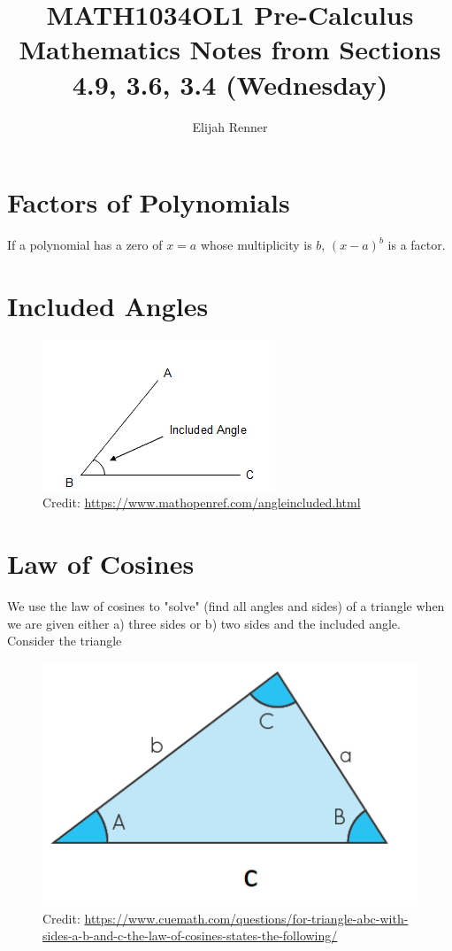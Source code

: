 \documentclass[12pt]{article}
\title{MATH1034OL1 Pre-Calculus Mathematics Notes from Sections 4.9, 3.6, 3.4 (Wednesday)}
\author{Elijah Renner}
\begin{document}
\maketitle

\vspace{0.5in}

\tableofcontents

\section{Factors of Polynomials}

If a polynomial has a zero of \(x=a\) whose multiplicity is \(b\), \((x-a)^b\) is a factor.

\section{Included Angles}

\begin{figure}[H]
	\centering
	\includegraphics[scale=1]{included.gif}
	\caption{Credit: \url{https://www.mathopenref.com/angleincluded.html}}
\end{figure}

\section{Law of Cosines}

We use the law of cosines to "solve" (find all angles and sides) of a triangle when we are given either a) three sides or b) two sides and the included angle.\\

Consider the triangle\\

\begin{figure}[H]
	\centering
	\includegraphics[scale=0.6]{abc.png}
	\caption{Credit: \url{https://www.cuemath.com/questions/for-triangle-abc-with-sides-a-b-and-c-the-law-of-cosines-states-the-following/}}
\end{figure}
\end{document}
